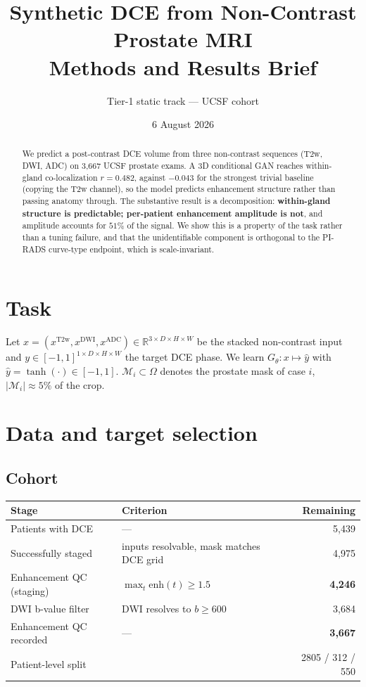 \documentclass[11pt]{article}
\title{Synthetic DCE from Non-Contrast Prostate MRI\\\large Methods and Results Brief}
\author{Tier-1 static track --- UCSF cohort}
\date{6 August 2026}
\newcommand{\yhat}{\hat{y}}
\newcommand{\roi}{\mathcal{M}}
\newcommand{\1}{\mathbb{1}}
\begin{document}
\maketitle

\begin{abstract}
\noindent
We predict a post-contrast DCE volume from three non-contrast sequences (T2w, DWI, ADC)
on 3{,}667 UCSF prostate exams. A 3D conditional GAN reaches within-gland co-localization
$r=0.482$, against $-0.043$ for the strongest trivial baseline (copying the T2w channel),
so the model predicts enhancement structure rather than passing anatomy through.
The substantive result is a decomposition: \textbf{within-gland structure is predictable;
per-patient enhancement amplitude is not}, and amplitude accounts for $51\%$ of the signal.
We show this is a property of the task rather than a tuning failure, and that the
unidentifiable component is orthogonal to the PI-RADS curve-type endpoint, which is
scale-invariant.
\end{abstract}

\section{Task}

Let $x=(x^{\text{T2w}},x^{\text{DWI}},x^{\text{ADC}})\in\mathbb{R}^{3\times D\times H\times W}$
be the stacked non-contrast input and $y\in[-1,1]^{1\times D\times H\times W}$ the target
DCE phase. We learn $G_\theta:x\mapsto\yhat$ with $\yhat=\tanh(\cdot)\in[-1,1]$.
$\roi_i\subset\Omega$ denotes the prostate mask of case $i$, $|\roi_i|\approx 5\%$ of the crop.

\section{Data and target selection}

\subsection{Cohort}

\begin{center}
\begin{tabular}{llr}
\toprule
Stage & Criterion & Remaining \\
\midrule
Patients with DCE & --- & 5{,}439 \\
Successfully staged & inputs resolvable, mask matches DCE grid & 4{,}975 \\
Enhancement QC (staging) & $\max_t \text{enh}(t) \ge 1.5$ & \textbf{4{,}246} \\
DWI b-value filter & DWI resolves to $b\ge600$ & 3{,}684 \\
Enhancement QC recorded & --- & \textbf{3{,}667} \\
\midrule
\multicolumn{2}{l}{Patient-level split} & 2805 / 312 / 550 \\
\bottomrule
\end{tabular}
\end{center}
\end{document}

